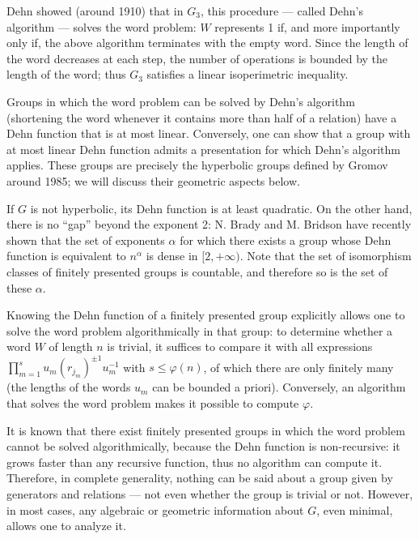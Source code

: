 \documentclass{amsart}
\let\phi=\varphi
\begin{document}
Dehn showed (around 1910) that in $G_3$, this procedure --- called Dehn’s
algorithm --- solves the word problem: $W$ represents 1 if, and more
importantly only if, the above algorithm terminates with the empty
word. Since the length of the word decreases at each step, the number
of operations is bounded by the length of the word; thus $G_3$
satisfies a linear isoperimetric inequality.

Groups in which the word problem can be solved by Dehn’s algorithm
(shortening the word whenever it contains more than half of a
relation) have a Dehn function that is at most linear. Conversely, one
can show that a group with at most linear Dehn function admits a
presentation for which Dehn’s algorithm applies. These groups are
precisely the hyperbolic groups defined by Gromov around 1985; we will
discuss their geometric aspects below.

If $G$ is not hyperbolic, its Dehn function is at least quadratic. On
the other hand, there is no ``gap'' beyond the exponent 2: N. Brady
and M. Bridson have recently shown%
that the set of exponents $\alpha$ for which there exists a group
whose Dehn function is equivalent to $n^\alpha$ is dense in
$[2, +\infty)$. Note that the set of isomorphism classes of finitely
presented groups is countable, and therefore so is the set of these
$\alpha$.

Knowing the Dehn function of a finitely presented group explicitly
allows one to solve the word problem algorithmically in that group: to
determine whether a word $W$ of length $n$ is trivial, it suffices to
compare it with all expressions
$\prod_{m=1}^{s} u_m (r_{j_m})^{\pm1} u_m^{-1}$ with
$s \le \phi(n)$, of which there are only finitely many (the lengths
of the words $u_m$ can be bounded a priori). Conversely, an algorithm
that solves the word problem makes it possible to compute $\phi$.

It is known that there exist finitely presented groups in which the
word problem cannot be solved algorithmically, because the Dehn
function is non-recursive: it grows faster than any recursive
function, thus no algorithm can compute it. Therefore, in complete
generality, nothing can be said about a group given by generators and
relations --- not even whether the group is trivial or not. However,
in most cases, any algebraic or geometric information about $G$, even
minimal, allows one to analyze it.
\end{document}
